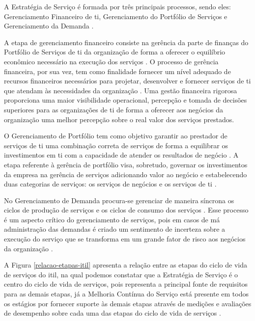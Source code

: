 A Estratégia de Serviço é formada por três principais processos, sendo eles: Gerenciamento Financeiro de \acrshort{ti}, Gerenciamento do Portfólio de Serviços e Gerenciamento da Demanda \cite{abreu2012implantando}.

A etapa de gerenciamento financeiro consiste na gerência da parte de finanças do Portfólio de Serviços de \acrshort{ti} da organização de forma a oferecer o equilíbrio econômico necessário na execução dos serviços \cite{abreu2012implantando}. O processo de gerência financeira, por sua vez, tem como finalidade fornecer um nível adequado de recursos financeiros necessários para projetar, desenvolver e fornecer serviços de \acrshort{ti} que atendam às necessidades da organização \cite{introductoryoverviewofitil}. Uma gestão financeira rigorosa proporciona uma maior visibilidade operacional, percepção e tomada de decisões superiores para as organizações de \acrshort{ti} de forma a oferecer aos negócios da organização uma melhor percepção sobre o real valor dos serviços prestados\cite{commerce2007official}.

O Gerenciamento de Portfólio tem como objetivo garantir ao prestador de serviços de \acrshort{ti} uma combinação correta de serviços de forma a equilibrar os investimentos em \acrshort{ti} com a capacidade de atender os resultados de negócio \cite{introductoryoverviewofitil}. A etapa referente à gerência de portfólio visa, sobretudo, governar os investimentos da empresa na gerência de serviços adicionando valor ao negócio e estabelecendo duas categorias de serviços: os serviços de negócios e os serviços de \acrshort{ti} \cite{abreu2012implantando}.

No Gerenciamento de Demanda procura-se gerenciar de maneira síncrona os ciclos de produção de serviços e os ciclos de consumo dos serviços \cite{abreu2012implantando}. Esse processo é um aspecto crítico do gerenciamento de serviços, pois em casos de má administração das demandas é criado um sentimento de incerteza sobre a execução do serviço que se transforma em um grande fator de risco aos negócios da organização \cite{introductoryoverviewofitil}.

A Figura \ref{relacao-etapas-itil} apresenta a relação entre as etapas do ciclo de vida de serviços do \acrshort{itil}, na qual podemos constatar que a Estratégia de Serviço é o centro  do ciclo de vida de serviços, pois representa a principal fonte de requisitos para as demais etapas, já a Melhoria Contínua do Serviço está presente em todos os estágios por fornecer suporte às demais etapas através de medições e avaliações de desempenho sobre cada uma das etapas do ciclo de vida de serviços \cite{abreu2012implantando}.

